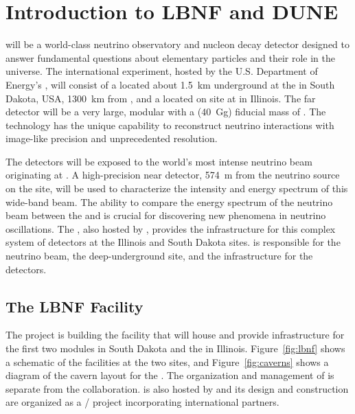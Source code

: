 \chapter{Introduction to LBNF and DUNE}
\label{ch:physics-intro}



 will be a world-class neutrino observatory and nucleon decay detector designed to answer fundamental questions about elementary particles and their role in the universe. The international  experiment, hosted by the U.S. Department of Energy's , will consist of a  located about \SI{1.5}{km} underground at the  in South Dakota, USA, \SI{1300}{\km} from , and a  located on site at  in Illinois. The far detector will be a very large, modular  with a \fdfiducialmass (\SI{40}{\giga\gram}) fiducial mass of . The  technology 
has the unique capability to reconstruct neutrino interactions with image-like precision and unprecedented resolution. 

The  detectors will be exposed to the world's most intense neutrino beam originating at . A high-precision near detector, \SI{574}{m} from the neutrino source on the  site, will be used to characterize the intensity and energy spectrum of this wide-band beam. The ability to compare the energy spectrum of the neutrino beam between the  and 
is crucial for discovering new phenomena in neutrino oscillations. The , also hosted by , provides the infrastructure for this complex system of detectors at the Illinois and South Dakota sites.  is responsible for the neutrino beam, the deep-underground site, and the infrastructure for the  detectors. 

\section{The LBNF Facility}
\label{sec:physics-intro-lbnf}

The  project is building the facility that will house and provide infrastructure for the first two   modules  in South Dakota  and the  in Illinois.  Figure~\ref{fig:lbnf} shows
a schematic of the facilities at the two sites, and Figure~\ref{fig:caverns} shows a diagram of the cavern layout for the .  
The organization and management of  is separate from the  collaboration.  is also hosted by  and its design and construction are organized as a / project incorporating international partners. 

